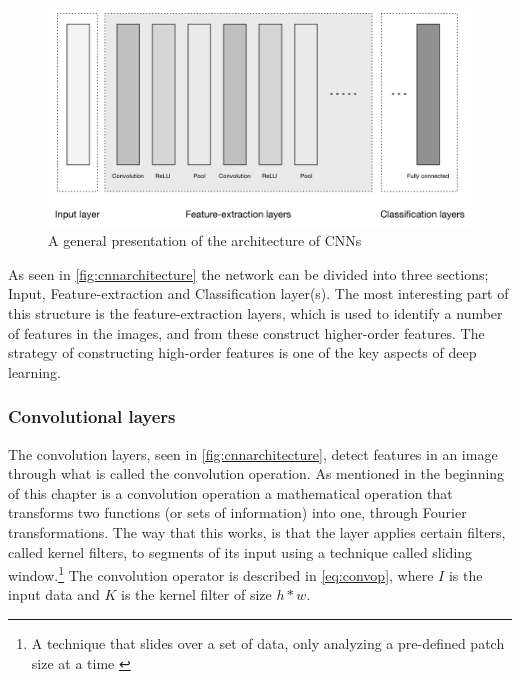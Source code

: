 \begin{figure}[!h]
	\centering
	\includegraphics[scale=0.6]{fig/cnn_architecture.png}
	\caption{A general presentation of the architecture of CNNs \cite{Patterson2017}}
	\label{fig:cnnarchitecture}
\end{figure}

As seen in \autoref{fig:cnnarchitecture} the network can be divided into three sections; Input, Feature-extraction and Classification layer(s). The most interesting part of this structure is the feature-extraction layers, which is used to identify a number of features in the images, and from these construct higher-order features. The strategy of constructing high-order features is one of the key aspects of deep learning.


\subsubsection{Convolutional layers}
The convolution layers, seen in \autoref{fig:cnnarchitecture}, detect features in an image through what is called the convolution operation. As mentioned in the beginning of this chapter is a convolution operation a mathematical operation that transforms two functions (or sets of information) into one, through Fourier transformations. The way that this works, is that the layer applies certain filters, called kernel filters, to segments of its input using a technique called sliding window.\footnote{A technique that slides over a set of data, only analyzing a pre-defined patch size at a time \cite{Stanford2017}} The convolution operator is described in  \autoref{eq:convop}, where $I$ is the input data and $K$ is the kernel filter of size $h*w$.

